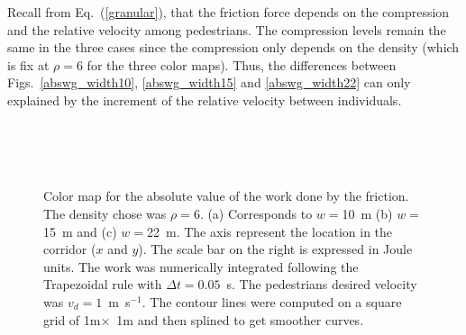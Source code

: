 \documentclass[preprint,12pt]{elsarticle}
\begin{document}
Recall from Eq.~(\ref{granular}), that the friction force depends on the 
compression and the relative velocity among pedestrians. The compression levels 
remain the same in the three cases since the compression only depends on the 
density (which is fix at $\rho=6$ for the three color maps). Thus, the 
differences between Figs.~\ref{abswg_width10}, \ref{abswg_width15} and 
\ref{abswg_width22} can only explained by the increment of the relative velocity 
between individuals. \\

\begin{figure}[!htbp]
\centering
    \\ 
    \\
    \
\caption[width=0.47\columnwidth] {Color map for the absolute value of the work done by the friction. The density chose was $\rho=6$. (a) Corresponds to $w=$10~m (b) $w=$15~m and (c) $w=$22~m. The axis represent the location in the corridor ($x$ and $y$). The scale bar on the right is expressed in Joule units. The work was numerically integrated following the Trapezoidal rule with $\Delta t =0.05$~s. The pedestrians desired velocity was $v_d = 1$~m~s$^{-1}$. The contour lines were computed on a square grid of 1m$\times$~1m and then splined to get smoother curves.} 
\label{abswg}
\end{figure}
\end{document}
